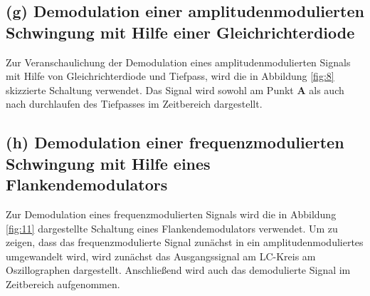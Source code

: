 \FloatBarrier
\subsection{(g) Demodulation einer amplitudenmodulierten Schwingung
mit Hilfe einer Gleichrichterdiode}
\label{subsec:durchfuehrung_g}
Zur Veranschaulichung der Demodulation eines amplitudenmodulierten Signals
mit Hilfe von Gleichrichterdiode und Tiefpass, wird die in Abbildung
\ref{fig:8} skizzierte Schaltung verwendet.
Das Signal wird sowohl am Punkt \textbf{A} als auch nach durchlaufen des Tiefpasses
im Zeitbereich dargestellt.


\FloatBarrier
\subsection{(h) Demodulation einer frequenzmodulierten Schwingung
mit Hilfe eines Flankendemodulators}
\label{subsec:durchfuehrung_h}
Zur Demodulation eines frequenzmodulierten Signals wird die in Abbildung
\ref{fig:11} dargestellte Schaltung eines Flankendemodulators verwendet.
Um zu zeigen, dass das frequenzmodulierte Signal zunächst in ein
amplitudenmoduliertes umgewandelt wird, wird zunächst das Ausgangssignal
am LC-Kreis am Oszillographen dargestellt. Anschließend wird
auch das demodulierte Signal im Zeitbereich aufgenommen.
